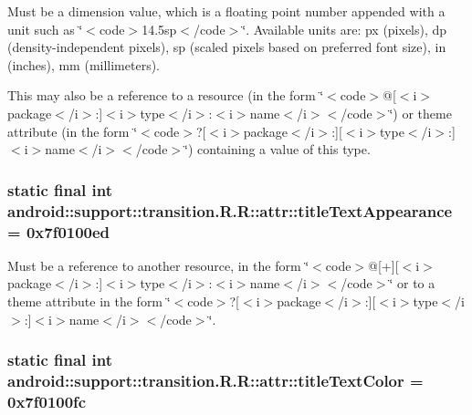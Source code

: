 Must be a dimension value, which is a floating point number appended with a unit such as \char`\"{}$<$code$>$14.5sp$<$/code$>$\char`\"{}. Available units are: px (pixels), dp (density-independent pixels), sp (scaled pixels based on preferred font size), in (inches), mm (millimeters). 

This may also be a reference to a resource (in the form \char`\"{}$<$code$>$@\mbox{[}$<$i$>$package$<$/i$>$:\mbox{]}$<$i$>$type$<$/i$>$:$<$i$>$name$<$/i$>$$<$/code$>$\char`\"{}) or theme attribute (in the form \char`\"{}$<$code$>$?\mbox{[}$<$i$>$package$<$/i$>$:\mbox{]}\mbox{[}$<$i$>$type$<$/i$>$:\mbox{]}$<$i$>$name$<$/i$>$$<$/code$>$\char`\"{}) containing a value of this type. \hypertarget{classandroid_1_1support_1_1transition_1_1_r_1_1attr_b95cc73fd613430199b731ca0c93e7a4}{
\subsubsection[{titleTextAppearance}]{\setlength{\rightskip}{0pt plus 5cm}static final int android::support::transition.R.R::attr::titleTextAppearance = 0x7f0100ed}}
\label{classandroid_1_1support_1_1transition_1_1_r_1_1attr_b95cc73fd613430199b731ca0c93e7a4}


Must be a reference to another resource, in the form \char`\"{}$<$code$>$@\mbox{[}+\mbox{]}\mbox{[}$<$i$>$package$<$/i$>$:\mbox{]}$<$i$>$type$<$/i$>$:$<$i$>$name$<$/i$>$$<$/code$>$\char`\"{} or to a theme attribute in the form \char`\"{}$<$code$>$?\mbox{[}$<$i$>$package$<$/i$>$:\mbox{]}\mbox{[}$<$i$>$type$<$/i$>$:\mbox{]}$<$i$>$name$<$/i$>$$<$/code$>$\char`\"{}. \hypertarget{classandroid_1_1support_1_1transition_1_1_r_1_1attr_a17b894ce30c1024e98da6073b6b8081}{
\subsubsection[{titleTextColor}]{\setlength{\rightskip}{0pt plus 5cm}static final int android::support::transition.R.R::attr::titleTextColor = 0x7f0100fc}}
\label{classandroid_1_1support_1_1transition_1_1_r_1_1attr_a17b894ce30c1024e98da6073b6b8081}


